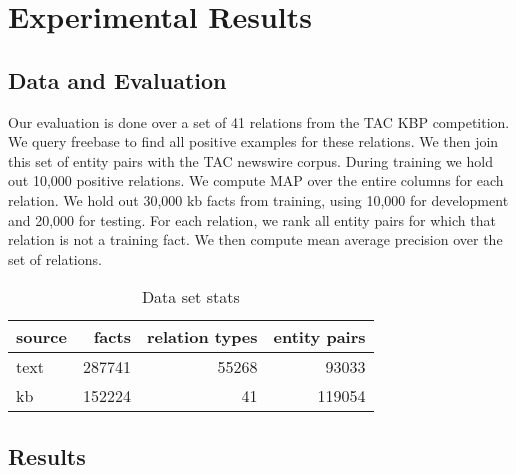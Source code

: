 \section{Experimental Results\label{sec:results}}

\subsection{Data and Evaluation}

Our evaluation is done over a set of 41 relations from the TAC KBP competition.
We query freebase to find all positive examples for these relations.
We then join this set of entity pairs with the TAC newswire corpus.
During training we hold out 10,000 positive relations.
We compute MAP over the entire columns for each relation.
We hold out 30,000 kb facts from training, using 10,000 for development and 20,000 for testing.
For each relation, we rank all entity pairs for which that relation is not a training fact.
We then compute mean average precision over the set of relations.


\begin{table}[h!]
\setlength{\tabcolsep}{4.1pt}
\begin{center}
\begin{tabular}{|l|r|r|r|}
\hline
\bf source & facts & relation types & entity pairs \\
\hline\hline
text & 287741 & 55268 & 93033  \\
\hline
kb & 152224 & 41 & 119054 \\
\hline

\hline
\end{tabular}
\caption{Data set stats
\label{data stats}}
\end{center}
\vspace{-.3cm}
\end{table}


\subsection {Results}
%

